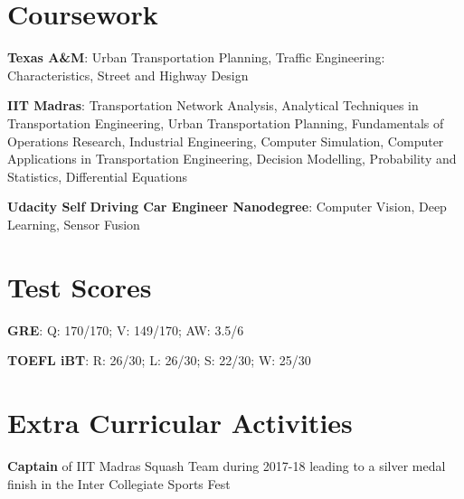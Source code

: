 \documentclass[letterpaper,11pt]{article}
\newcommand{\resumeItem}[2]{
  \item\small{
    \textbf{#1}{: #2 \vspace{-2pt}}
  }
}
\newcommand{\ritem}[1]{
  \item\small{
    {#1 \vspace{-2pt}}
  }
}
\newcommand{\resumeSubItem}[2]{\resumeItem{#1}{#2}\vspace{-4pt}}
\newcommand{\resumeSubHeadingListStart}{\begin{description}[leftmargin=*]}
\newcommand{\resumeSubHeadingListEnd}{\end{description}\vspace{-6pt}}
\begin{document}
\section{Coursework}
  \resumeSubHeadingListStart
    \justifying\resumeSubItem{Texas A\&M}
    {Urban Transportation Planning, Traffic Engineering: Characteristics, Street and Highway Design}
    \justifying\resumeSubItem
      {IIT Madras}{Transportation Network Analysis, Analytical Techniques in Transportation Engineering, Urban Transportation Planning, Fundamentals of Operations Research, Industrial Engineering, Computer Simulation, Computer Applications in Transportation Engineering, Decision Modelling, Probability and Statistics, Differential Equations}
    \justifying\resumeSubItem
      {Udacity Self Driving Car Engineer Nanodegree}{Computer Vision, Deep Learning, Sensor Fusion}
  \resumeSubHeadingListEnd

\section{Test Scores}
  \resumeSubHeadingListStart
    \resumeSubItem{GRE}
      {Q: 170/170; V: 149/170; AW: 3.5/6}
    \resumeSubItem{TOEFL iBT}
      {R: 26/30; L: 26/30; S: 22/30; W: 25/30}
  \resumeSubHeadingListEnd

\section{Extra Curricular Activities}
  \resumeSubHeadingListStart
    \ritem{\textbf{Captain} of IIT Madras Squash Team during 2017-18 leading to a silver medal finish in the Inter Collegiate Sports Fest}
  \resumeSubHeadingListEnd

\end{document}
